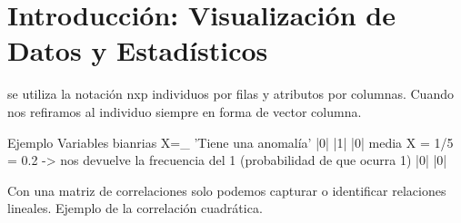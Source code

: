 
\newcommand{\estudiante}{García Justel, Alan}
\newcommand{\titulo}{MÁSTER EN INGENIERÍA COMPUTACIONAL Y SISTEMAS INTELIGENTES}
\newcommand{\asignatura}{EXPLORACIÓN Y ANÁLISIS DE DATOS}
\newcommand{\portada}{common/no_signal.png}
\newcommand{\colorportada}{title_green}
\newcommand{\curso}{2024-2025}





\newpage


\section{Introducción: Visualización de Datos y Estadísticos}

se utiliza la notación nxp individuos por filas y atributos por columnas. Cuando nos refiramos al individuo siempre en forma de vector columna.

Ejemplo
Variables bianrias
X=_ 'Tiene una anomalía'
|0|
|1|
|0| media X = 1/5 = 0.2 -> nos devuelve la frecuencia del 1 (probabilidad de que ocurra 1)
|0|
|0|


Con una matriz de correlaciones solo podemos capturar o identificar relaciones lineales. Ejemplo de la correlación cuadrática.


